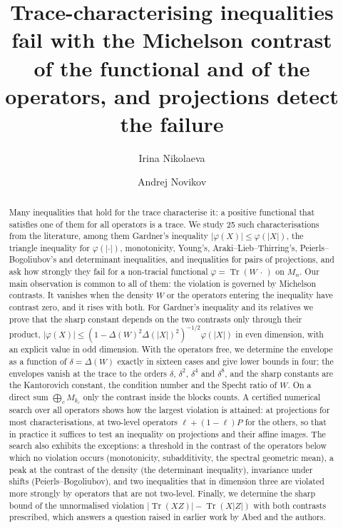 \documentclass[11pt]{article}
\title{Trace-characterising inequalities fail with the Michelson contrast\\
of the functional and of the operators, and projections detect the failure}
\author{Irina Nikolaeva \and Andrej Novikov}
\date{}
\DeclareMathOperator{\Tr}{Tr}
\theoremstyle{plain}
\theoremstyle{definition}
\theoremstyle{remark}
\begin{document}
\maketitle

\begin{abstract}
Many inequalities that hold for the trace characterise it: a positive functional that satisfies one of them for all
operators is a trace. We study 25 such characterisations from the literature, among them Gardner's inequality
$|\varphi(X)|\le\varphi(|X|)$, the triangle inequality for $\varphi(|\cdot|)$, monotonicity, Young's,
Araki--Lieb--Thirring's, Peierls--Bogoliubov's and determinant inequalities, and inequalities for pairs of projections,
and ask how strongly they fail for a non-tracial functional $\varphi=\Tr(W\,\cdot\,)$ on $M_n$. Our main observation
is common to all of them: the violation is governed by Michelson contrasts. It vanishes when the density $W$ or the
operators entering the inequality have contrast zero, and it rises with both. For Gardner's inequality and its
relatives we prove that the sharp constant depends on the two contrasts only through their product,
$|\varphi(X)|\le(1-\Delta(W)^2\Delta(|X|)^2)^{-1/2}\varphi(|X|)$ in even dimension, with an explicit value in odd
dimension. With the operators free, we determine the envelope as a function of $\delta=\Delta(W)$ exactly in sixteen
cases and give lower bounds in four; the envelopes vanish at the trace to the orders $\delta$, $\delta^2$, $\delta^4$
and $\delta^8$, and the sharp constants are the Kantorovich constant, the condition number and the Specht ratio of $W$.
On a direct sum $\bigoplus_cM_{k_c}$ only the contrast inside the blocks counts. A certified numerical search over all
operators shows how the largest violation is attained: at projections for most characterisations, at two-level
operators $\ell+(1-\ell)P$ for the others, so that in practice it suffices to test an inequality on projections and
their affine images. The search also exhibits the exceptions: a threshold in the contrast of the operators below which
no violation occurs (monotonicity, subadditivity, the spectral geometric mean), a peak at the contrast of the density
(the determinant inequality), invariance under shifts (Peierls--Bogoliubov), and two inequalities that in dimension
three are violated more strongly by operators that are not two-level. Finally, we determine the sharp bound of the
unnormalised violation $|\Tr(XZ)|-\Tr(X|Z|)$ with both contrasts prescribed, which answers a question raised in earlier
work by Abed and the authors.
\end{abstract}
\end{document}
